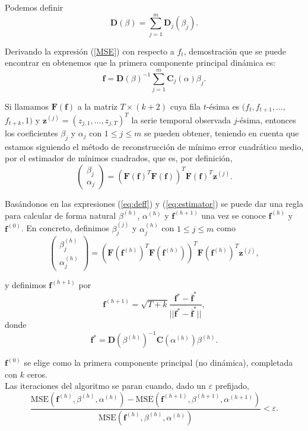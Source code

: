 Podemos definir 
\[	\mathbf{D}(\beta) = \sum_{j=1}^m \mathbf{D}_j(\beta_j).	\]

Derivando la expresión (\ref{MSE}) con respecto a $f_t$, demostración que se puede encontrar en \cite{penaMas} obtenemos que la primera componente principal dinámica es:
\begin{equation}\label{eq:deff}
	\mathbf{f} = \mathbf{D}(\beta)^{-1} \sum_{j=1}^m \mathbf{C}_j(\alpha)\beta_j.
\end{equation}

Si llamamos $\mathbf{F}(\mathbf{f})$ a la matriz $T \times (k+2)$ cuya fila $t$-ésima es $(f_t, f_{t+1}, \dots,$ $ f_{t+k},1)$ y $\mathbf{z}^{(j)} = (z_{j,1}, \dots, z_{j,T})^T$ la serie temporal observada $j$-ésima, entonces los coeficientes $\beta_j$ y $\alpha_j$ con $1 \leq j \leq m$ se pueden obtener, teniendo en cuenta que estamos siguiendo el método de reconstrucción de mínimo error cuadrático medio, por el estimador de mínimos cuadrados, que es, por definición,
\begin{equation}\label{eq:estimator}
	\left( \begin{array}{c}
	\beta_j \\
	\alpha_j  \end{array} \right) = 
	(\mathbf{F}(\mathbf{f})^T \mathbf{F}(\mathbf{f}))^T \mathbf{F}(\mathbf{f})^T \mathbf{z}^{(j)}.   
\end{equation}

Basándonos en las expresiones (\ref{eq:deff}) y (\ref{eq:estimator}) se puede dar una regla para calcular de forma natural $\beta^{(h)}$, $\alpha^{(h)}$ y $\mathbf{f}^{(h+1)}$ una vez se conoce $\mathbf{f}^{(h)}$ y $\mathbf{f}^{(0)}$. En concreto, definimos $\beta_j^{(j)}$ y $\alpha_j^{(h)}$ con $1 \leq j \leq m$ como
\[	\left( \begin{array}{c}
	\beta_j^{(h)} \\
	\alpha_j^{(h)}  \end{array} \right) = 
	(\mathbf{F}(\mathbf{f}^{(h)})^T \mathbf{F}(\mathbf{f}^{(h)}))^T \mathbf{F}(\mathbf{f}^{(h)})^T \mathbf{z}^{(j)},
\]

y definimos $\mathbf{f}^{(h+1)}$ por
\[	\mathbf{f}^{(h+1)} = \sqrt{T+k} \frac{\mathbf{f}^* - \overline{\mathbf{f}}^*}{||\mathbf{f}^* - \overline{\mathbf{f}}^*||},	\]
donde
\[	\mathbf{f}^* = \mathbf{D}(\beta^{(h)})^{-1} \mathbf{C}(\alpha^{(h)})\beta^{(h)}.	\]

$\mathbf{f}^{(0)}$ se elige como la primera componente principal (no dinámica), completada con $k$ ceros.\\

Las iteraciones del algoritmo se paran cuando, dado un $\varepsilon$ prefijado,
\[	\frac{\text{MSE}(\mathbf{f}^{(h)},\beta^{(h)},\alpha^{(h)}) - \text{MSE}(\mathbf{f}^{(h+1)},\beta^{(h+1)},\alpha^{(h+1)})}{\text{MSE}(\mathbf{f}^{(h)},\beta^{(h)},\alpha^{(h)})} < \varepsilon.	\]







%